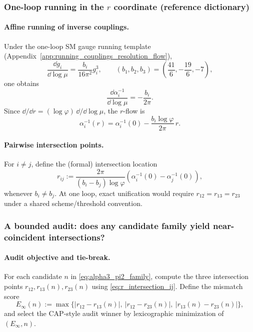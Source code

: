 \subsubsection{One-loop running in the \texorpdfstring{$r$}{r} coordinate (reference dictionary)}
\paragraph{Affine running of inverse couplings.}
\InterfaceTag Under the one-loop SM gauge running template (Appendix~\ref{app:running_couplings_resolution_flow}),
\[
\frac{\dd g_i}{\dd\log\mu}=\frac{b_i}{16\pi^2}g_i^3,\qquad (b_1,b_2,b_3)=\left(\frac{41}{6},-\frac{19}{6},-7\right),
\]
one obtains
\[
\frac{\dd\alpha_i^{-1}}{\dd\log\mu}=-\frac{b_i}{2\pi}.
\]
Since $\dd/\dd r=(\log\varphi)\,\dd/\dd\log\mu$, the $r$-flow is
\begin{equation}
\label{eq:alpha_inv_affine_in_r}
\alpha_i^{-1}(r)=\alpha_i^{-1}(0)-\frac{b_i\log\varphi}{2\pi}\,r.
\end{equation}

\paragraph{Pairwise intersection points.}
For $i\ne j$, define the (formal) intersection location
\begin{equation}
\label{eq:r_intersection_ij}
r_{ij}:=\frac{2\pi}{(b_i-b_j)\log\varphi}\left(\alpha_i^{-1}(0)-\alpha_j^{-1}(0)\right),
\end{equation}
whenever $b_i\ne b_j$.
At one loop, exact unification would require $r_{12}=r_{13}=r_{23}$ under a shared scheme/threshold convention.

\subsubsection{A bounded audit: does any candidate family yield near-coincident intersections?}
\paragraph{Audit objective and tie-break.}
\AuditTag For each candidate $n$ in \eqref{eq:alpha3_pi2_family}, compute the three intersection points $r_{12},r_{13}(n),r_{23}(n)$ using \eqref{eq:r_intersection_ij}.
Define the mismatch score
\[
E_\infty(n):=\max\{|r_{12}-r_{13}(n)|,\ |r_{12}-r_{23}(n)|,\ |r_{13}(n)-r_{23}(n)|\},
\]
and select the CAP-style audit winner by lexicographic minimization of $(E_\infty,n)$.


